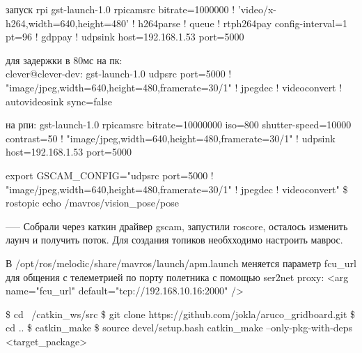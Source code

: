 запуск rpi
gst-launch-1.0 rpicamsrc bitrate=1000000 ! 'video/x-h264,width=640,height=480' ! h264parse ! queue ! rtph264pay config-interval=1 pt=96 ! gdppay ! udpsink host=192.168.1.53 port=5000

для задержки в 80мс на пк:\\
clever@clever-dev: gst-launch-1.0 udpsrc port=5000 ! "image/jpeg,width=640,height=480,framerate=30/1" ! jpegdec ! videoconvert ! autovideosink sync=false

на рпи:
gst-launch-1.0 rpicamsrc bitrate=10000000 iso=800 shutter-speed=10000 contrast=50 ! "image/jpeg,width=640,height=480,framerate=30/1" ! udpsink host=192.168.1.53 port=5000

export GSCAM\_CONFIG="udpsrc port=5000 ! "image/jpeg,width=640,height=480,framerate=30/1" ! jpegdec ! videoconvert"
\$ rostopic echo /mavros/vision\_pose/pose

-----
Собрали через каткин драйвер gscam, запустили roscore, осталось изменить лаунч и получить поток.
Для создания топиков необхходимо настроить маврос.

В /opt/ros/melodic/share/mavros/launch/apm.launch меняется параметр fcu\_url для общения с телеметрией по порту полетника с помощью ser2net proxy:
<arg name="fcu\_url" default="tcp://192.168.10.16:2000" />

\$ cd ~/catkin\_ws/src
\$ git clone https://github.com/jokla/aruco\_gridboard.git
\$ cd ..
\$ catkin\_make
\$ source devel/setup.bash
catkin\_make --only-pkg-with-deps <target\_package>


